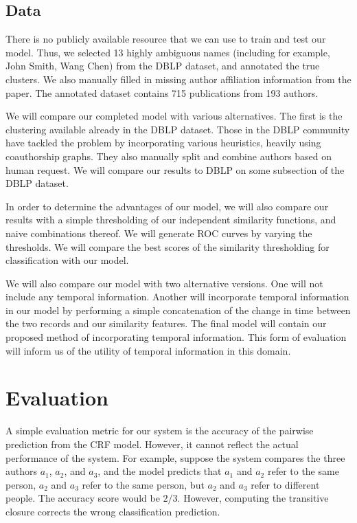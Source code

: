 \documentclass[twocolumn,letterpaper]{article}
\begin{document}
\subsection{Data}
There is no publicly available resource that we can use to train and test our model.  Thus, we selected 13 highly ambiguous names (including for example, John Smith, Wang Chen) from the DBLP dataset, and annotated the true clusters.  We also manually filled in missing author affiliation information from the paper.  The annotated dataset contains 715 publications from 193 authors.

We will compare our completed model with various alternatives. The first is the clustering available already in the DBLP dataset. Those in the DBLP community have tackled the problem by incorporating various heuristics, heavily using coauthorship graphs. They also manually split and combine authors based on human request. We will compare our results to DBLP on some subsection of the DBLP dataset. 

In order to determine the advantages of our model, we will also compare our results with a simple thresholding of our independent similarity functions, and naive combinations thereof. We will generate ROC curves by varying the thresholds. We will compare the best scores of the similarity thresholding for classification with our model.

We will also compare our model with two alternative versions. One will not include any temporal information. Another will incorporate temporal information in our model by performing a simple concatenation of the change in time between the two records and our similarity features. The final model will contain our proposed method of incorporating temporal information. This form of evaluation will inform us of the utility of temporal information in this domain.

\section{Evaluation} %
\label{sec:evaluation}
A simple evaluation metric for our system is the accuracy
of the pairwise prediction from the CRF model.  However, it cannot
reflect the actual performance of the system.  For example, suppose
the system compares the three authors $a_1$, $a_2$, and $a_3$, and the
model predicts that $a_1$ and $a_2$ refer to the same person, $a_2$
and $a_3$ refer to the same person, but $a_2$ and $a_3$ refer to
different people.  The accuracy score would be $2/3$.  However,
computing the transitive closure corrects the wrong classification
prediction.
\end{document}

